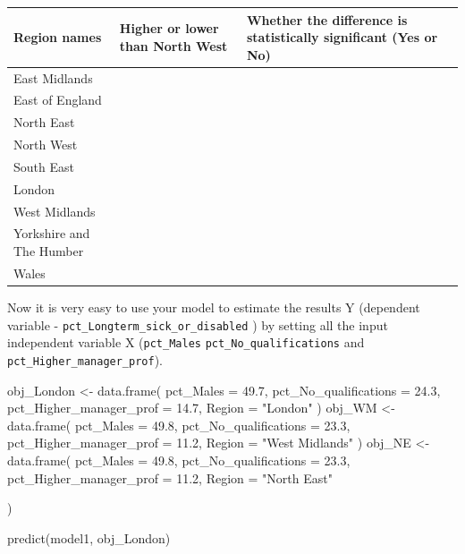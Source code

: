 \documentclass[
  letterpaper,
  DIV=11,
  numbers=noendperiod]{scrreprt}
\newenvironment{Shaded}{\begin{snugshade}}{\end{snugshade}}
\newcommand{\AttributeTok}[1]{\textcolor[rgb]{0.40,0.45,0.13}{#1}}
\newcommand{\FloatTok}[1]{\textcolor[rgb]{0.68,0.00,0.00}{#1}}
\newcommand{\FunctionTok}[1]{\textcolor[rgb]{0.28,0.35,0.67}{#1}}
\newcommand{\NormalTok}[1]{\textcolor[rgb]{0.00,0.23,0.31}{#1}}
\newcommand{\OtherTok}[1]{\textcolor[rgb]{0.00,0.23,0.31}{#1}}
\newcommand{\StringTok}[1]{\textcolor[rgb]{0.13,0.47,0.30}{#1}}
\begin{document}
\begin{longtable}[]{@{}
  >{\centering\arraybackslash}p{}
  >{\centering\arraybackslash}p{}
  >{\centering\arraybackslash}p{}@{}}
\toprule\noalign{}
\begin{minipage}[b]{\linewidth}\centering
Region names
\end{minipage} & \begin{minipage}[b]{\linewidth}\centering
Higher or lower than North West
\end{minipage} & \begin{minipage}[b]{\linewidth}\centering
Whether the difference is statistically significant (Yes or No)
\end{minipage} \\
\midrule\noalign{}
\endhead
\bottomrule\noalign{}
\endlastfoot
East Midlands & & \\
East of England & & \\
North East & & \\
North West & & \\
South East & & \\
London & & \\
West Midlands & & \\
Yorkshire and The Humber & & \\
Wales & & \\
\end{longtable}

Now it is very easy to use your model to estimate the results Y
(dependent variable - \texttt{pct\_Longterm\_sick\_or\_disabled} ) by
setting all the input independent variable X (\texttt{pct\_Males}
\texttt{pct\_No\_qualifications} and
\texttt{pct\_Higher\_manager\_prof}).

\begin{Shaded}
\begin{Highlighting}[]
\NormalTok{obj\_London }\OtherTok{\textless{}{-}} \FunctionTok{data.frame}\NormalTok{(}
  \AttributeTok{pct\_Males =} \FloatTok{49.7}\NormalTok{,}
  \AttributeTok{pct\_No\_qualifications =} \FloatTok{24.3}\NormalTok{,}
  \AttributeTok{pct\_Higher\_manager\_prof =} \FloatTok{14.7}\NormalTok{,}
  \AttributeTok{Region =} \StringTok{"London"}
\NormalTok{) }
\NormalTok{obj\_WM }\OtherTok{\textless{}{-}} \FunctionTok{data.frame}\NormalTok{(}
  \AttributeTok{pct\_Males =} \FloatTok{49.8}\NormalTok{,}
  \AttributeTok{pct\_No\_qualifications =} \FloatTok{23.3}\NormalTok{,}
  \AttributeTok{pct\_Higher\_manager\_prof =} \FloatTok{11.2}\NormalTok{,}
  \AttributeTok{Region =} \StringTok{"West Midlands"}
\NormalTok{) }
\NormalTok{obj\_NE }\OtherTok{\textless{}{-}} \FunctionTok{data.frame}\NormalTok{(}
  \AttributeTok{pct\_Males =} \FloatTok{49.8}\NormalTok{,}
  \AttributeTok{pct\_No\_qualifications =} \FloatTok{23.3}\NormalTok{,}
  \AttributeTok{pct\_Higher\_manager\_prof =} \FloatTok{11.2}\NormalTok{,}
  \AttributeTok{Region =} \StringTok{"North East"}
  
\NormalTok{) }

\FunctionTok{predict}\NormalTok{(model1, obj\_London) }
\end{Highlighting}
\end{Shaded}
\end{document}
